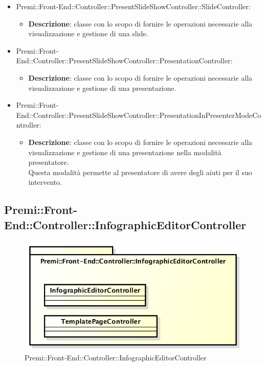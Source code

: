 	\begin{itemize}
		 \item Premi::Front-End::Controller::PresentSlideShowController::SlideController:
			\begin{itemize}
				\item \textbf{Descrizione}: classe con lo scopo di fornire le operazioni necessarie alla visualizzazione e gestione di una \gls{slide}.
			\end{itemize}
		\item  Premi::Front-End::Controller::PresentSlideShowController::PresentationController: 
			 \begin{itemize}
				\item \textbf{Descrizione}: classe con lo scopo di fornire le operazioni necessarie alla visualizzazione e gestione di una presentazione.
			\end{itemize}
		\item Premi::Front-End::Controller::PresentSlideShowController::PresentationInPresenterModeController:
			\begin{itemize}
				\item \textbf{Descrizione}: classe con lo scopo di fornire le operazioni necessarie alla visualizzazione e gestione di una presentazione nella modalità presentatore. 
				\\Questa modalità permette al presentatore di avere degli aiuti per il suo intervento.
			\end{itemize}
	\end{itemize}
	
\newpage	
\subsection{Premi::Front-End::Controller::InfographicEditorController}
\begin{figure}[h]
\centering
\includegraphics[width=0.7\linewidth]{img/front-end_controller_infographiceditorcontroller}
\caption[Premi::Front-End::Controller::InfographicEditorController]{Premi::Front-End::Controller::InfographicEditorController}
\label{fig:front-end_controller_infographiceditorcontroller}
\end{figure}

